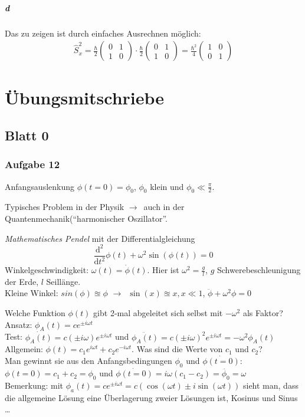 \documentclass[oneside]{book}
\theoremstyle{definition}
\newcommand{\conseq}{$\rightarrow$~}
\newcommand{\QM}{Quantenmechanik}
\newcommand{\Dgl}{Differentialgleichung}
\renewcommand{\d}{\mathrm d}
\begin{document}
\paragraph{d}
Das zu zeigen ist durch einfaches Ausrechnen möglich:
\begin{align*}
	\hat{S}_x^2 = \frac{\hbar}{2} \begin{pmatrix}
	0 & 1\\ 1 & 0
	\end{pmatrix} \cdot \frac{\hbar}{2} \begin{pmatrix}
	0 & 1\\ 1 & 0
	\end{pmatrix} = \frac{\hbar^2}{4} \begin{pmatrix}
	1 & 0\\ 0 & 1
	\end{pmatrix} 
\end{align*}

\chapter{Übungsmitschriebe}

\section{Blatt 0}
\subsection{Aufgabe 12}
Anfangsauslenkung $\phi(t = 0) = \phi_0$, $\phi_0$ klein und $\phi_0 \ll \frac{\pi}{2}$.

Typisches Problem in der Physik \conseq auch in der \QM ("`harmonischer Oszillator"'.
 
\textit{Mathematisches Pendel} mit der \Dgl
$$ \frac{\d^2}{\d t^2} \phi(t) + \omega^2 \sin(\phi(t)) = 0$$
Winkelgeschwindigkeit: $\omega(t) = \dot\phi(t)$. Hier ist $\omega^2 = \frac{g}{l}$, $g$ Schwerebeschleunigung der Erde, $l$ Seillänge.\\
Kleine Winkel: $sin(\phi) \approxeq \phi$ \conseq $\sin(x) \approxeq x, x \ll 1$, $\ddot{\phi} + \omega^2 \phi = 0$

Welche Funktion $\phi(t)$ gibt 2-mal abgeleitet sich selbst mit $-\omega^2$ als Faktor?\\
Ansatz: $\phi_A(t) = c e^{\pm i \omega t}$\\
Test: $\dot{\phi_A(t)} = c (\pm i \omega) e^{\pm i \omega t}$ und $\ddot{\phi_A(t)} = c (\pm i \omega)^2 e^{\pm i \omega t} = - \omega^2 \phi_A(t)$\\
Allgemein: $\phi(t) = c_1 e^{i \omega t} + c_2 e^{- i \omega t}$. Was sind die Werte von $c_1$ und $c_2$?\\
Man gewinnt sie aus den Anfangsbedingungen $\phi_0$ und $\dot{\phi(t = 0)}$: $\phi(t = 0) = c_1 + c_2 = \phi_0$ und $\dot{\phi(t = 0)} = i \omega (c_1 - c_2) = \dot{\phi_0} = \omega$\\
Bemerkung: mit $\phi_a(t) = c e^{\pm i \omega t} = c (\cos(\omega t) \pm i \sin(\omega t))$ sieht man, dass die allgemeine Lösung eine Überlagerung zweier Lösungen ist, Kosinus und Sinus \dots
\end{document}
